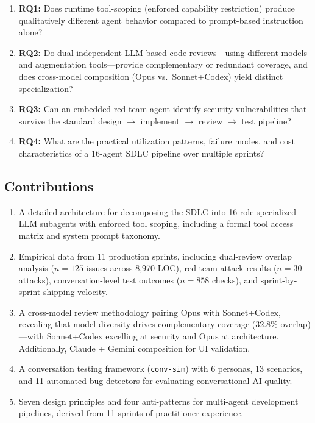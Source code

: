 \documentclass[a4paper,USenglish,cleveref,autoref]{lipics-v2021}
\begin{document}
\begin{enumerate}
    \item \textbf{RQ1:} Does runtime tool-scoping (enforced capability restriction) produce qualitatively different agent behavior compared to prompt-based instruction alone?
    \item \textbf{RQ2:} Do dual independent LLM-based code reviews---using different models and augmentation tools---provide complementary or redundant coverage, and does cross-model composition (Opus vs.\ Sonnet+Codex) yield distinct specialization?
    \item \textbf{RQ3:} Can an embedded red team agent identify security vulnerabilities that survive the standard design $\rightarrow$ implement $\rightarrow$ review $\rightarrow$ test pipeline?
    \item \textbf{RQ4:} What are the practical utilization patterns, failure modes, and cost characteristics of a 16-agent SDLC pipeline over multiple sprints?
\end{enumerate}

\subsection{Contributions}

\begin{enumerate}
    \item A detailed architecture for decomposing the SDLC into 16 role-specialized LLM subagents with enforced tool scoping, including a formal tool access matrix and system prompt taxonomy.
    \item Empirical data from 11 production sprints, including dual-review overlap analysis ($n=125$ issues across 8{,}970 LOC), red team attack results ($n=30$ attacks), conversation-level test outcomes ($n=858$ checks), and sprint-by-sprint shipping velocity.
    \item A cross-model review methodology pairing Opus with Sonnet+Codex, revealing that model diversity drives complementary coverage (32.8\% overlap)---with Sonnet+Codex excelling at security and Opus at architecture. Additionally, Claude + Gemini composition for UI validation.
    \item A conversation testing framework (\texttt{conv-sim}) with 6 personas, 13 scenarios, and 11 automated bug detectors for evaluating conversational AI quality.
    \item Seven design principles and four anti-patterns for multi-agent development pipelines, derived from 11 sprints of practitioner experience.
\end{enumerate}
\end{document}
